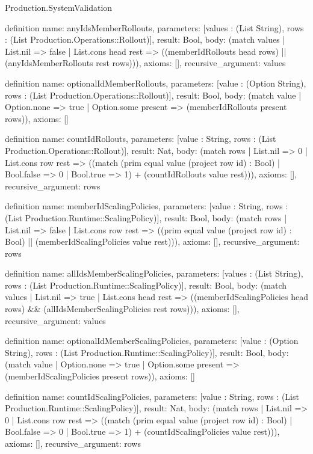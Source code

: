 \begin{lexlean}{Production.SystemValidation}
\begin{semanticmodule}
definition{
  name: anyIdsMemberRollouts,
  parameters: [values : (List String), rows : (List Production.Operations::Rollout)],
  result: Bool,
  body: (match values
    | List.nil => false
    | List.cons head rest => ((memberIdRollouts head rows) || (anyIdsMemberRollouts rest rows))),
  axioms: [],
  recursive_argument: values
}

definition{
  name: optionalIdMemberRollouts,
  parameters: [value : (Option String), rows : (List Production.Operations::Rollout)],
  result: Bool,
  body: (match value
    | Option.none => true
    | Option.some present => (memberIdRollouts present rows)),
  axioms: []
}

definition{
  name: countIdRollouts,
  parameters: [value : String, rows : (List Production.Operations::Rollout)],
  result: Nat,
  body: (match rows
    | List.nil => 0
    | List.cons row rest => ((match (prim equal value (project row id) : Bool)
      | Bool.false => 0
      | Bool.true => 1) + (countIdRollouts value rest))),
  axioms: [],
  recursive_argument: rows
}

definition{
  name: memberIdScalingPolicies,
  parameters: [value : String, rows : (List Production.Runtime::ScalingPolicy)],
  result: Bool,
  body: (match rows
    | List.nil => false
    | List.cons row rest => ((prim equal value (project row id) : Bool) || (memberIdScalingPolicies value rest))),
  axioms: [],
  recursive_argument: rows
}

definition{
  name: allIdsMemberScalingPolicies,
  parameters: [values : (List String), rows : (List Production.Runtime::ScalingPolicy)],
  result: Bool,
  body: (match values
    | List.nil => true
    | List.cons head rest => ((memberIdScalingPolicies head rows) && (allIdsMemberScalingPolicies rest rows))),
  axioms: [],
  recursive_argument: values
}

definition{
  name: optionalIdMemberScalingPolicies,
  parameters: [value : (Option String), rows : (List Production.Runtime::ScalingPolicy)],
  result: Bool,
  body: (match value
    | Option.none => true
    | Option.some present => (memberIdScalingPolicies present rows)),
  axioms: []
}

definition{
  name: countIdScalingPolicies,
  parameters: [value : String, rows : (List Production.Runtime::ScalingPolicy)],
  result: Nat,
  body: (match rows
    | List.nil => 0
    | List.cons row rest => ((match (prim equal value (project row id) : Bool)
      | Bool.false => 0
      | Bool.true => 1) + (countIdScalingPolicies value rest))),
  axioms: [],
  recursive_argument: rows
}


\end{semanticmodule}
\end{lexlean}
